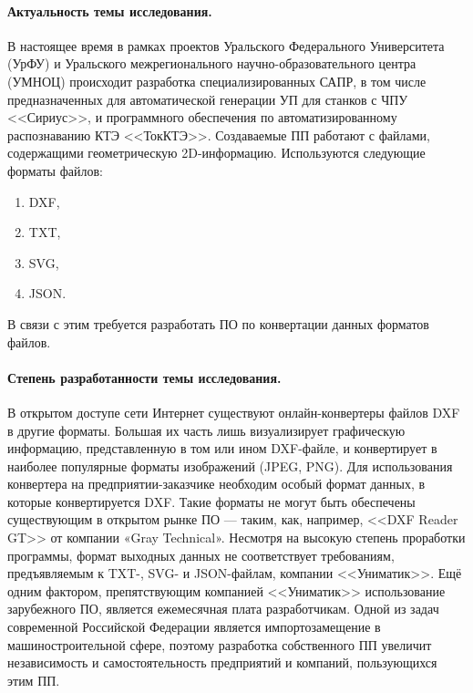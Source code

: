 \Introduction

\paragraph{Актуальность темы исследования.} В настоящее время в рамках проектов Уральского Федерального Университета (УрФУ) и Уральского межрегионального научно-образовательного центра (УМНОЦ) происходит разработка специализированных САПР, в том числе предназначенных для автоматической генерации УП для станков с ЧПУ <<Сириус>>, и программного обеспечения по автоматизированному распознаванию КТЭ <<ТокКТЭ>>. Создаваемые ПП работают с файлами, содержащими геометрическую 2D-информацию. Используются следующие форматы файлов:

\begin{enumerate}
	\item DXF,
	\item TXT,
	\item SVG,
	\item JSON.
\end{enumerate}

В связи с этим требуется разработать ПО по конвертации данных форматов файлов.

\paragraph{Степень разработанности темы исследования.} В открытом доступе сети Интернет существуют онлайн-конвертеры файлов DXF в другие форматы. Большая их часть лишь визуализирует графическую информацию, представленную в том или ином DXF-файле, и конвертирует в наиболее популярные форматы изображений (JPEG, PNG). Для использования конвертера на предприятии-заказчике необходим особый формат данных, в которые конвертируется DXF. Такие форматы не могут быть обеспечены существующим в открытом рынке ПО --- таким, как, например, <<DXF Reader GT>> от компании «Gray Technical». Несмотря на высокую степень проработки программы, формат выходных данных не соответствует требованиям, предъявляемым к TXT-, SVG- и JSON-файлам, компании <<Униматик>>. Ещё одним фактором, препятствующим компанией <<Униматик>> использование зарубежного ПО, является ежемесячная плата разработчикам. Одной из задач современной Российской Федерации является импортозамещение в машиностроительной сфере, поэтому разработка собственного ПП увеличит независимость и самостоятельность предприятий и компаний, пользующихся этим ПП.

